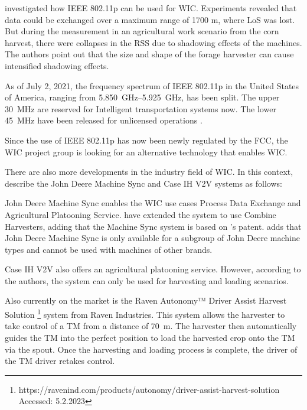\textcite{klingler_agriculture_2018} investigated how IEEE 802.11p can be used for \ac{WIC}. Experiments revealed
that data could be exchanged over a maximum range of 1700 m, where \ac{LoS} was lost. But during the
measurement in an agricultural work scenario from the corn harvest, there were collapses in the \ac{RSS}
due to shadowing effects of the machines. The authors point out that the size and shape of the forage harvester
can cause intensified shadowing effects.

As of July 2, 2021, the frequency spectrum of IEEE 802.11p in the United States of America, ranging from
\SIrange{5,850}{5,925}{\giga\hertz}, has been split. The upper \SI{30}{\mega\hertz} are reserved for
Intelligent transportation systems now. The lower \SI{45}{\mega\hertz} have been released for unlicensed
operations \cite{noauthor_use_2021}.

Since the use of IEEE 802.11p has now been newly
regulated by the FCC, the \ac{WIC} project group is looking for an alternative technology that enables \ac{WIC}.





There are also more developments in the industry field of \ac{WIC}. In this context, \textcite{thomasson_review_2018} describe the John Deere Machine Sync and Case IH V2V systems as follows:

John Deere Machine Sync enables the \ac{WIC} use cases Process Data Exchange and Agricultural Platooning Service. \textcite{liu_automation_2022} have extended the system to use Combine Harvesters, adding that the Machine Sync system is based on \textcite{metzler_system_2006}'s patent.
\textcite{smolnik_5g_2020} adds that John Deere Machine Sync is only available for a subgroup of John Deere machine types and cannot be used with machines of other brands.

Case IH V2V also offers an agricultural platooning service. However, according to the authors, the system can only be used for harvesting and loading scenarios.

Also currently on the market is the Raven Autonomy™ Driver Assist Harvest Solution \footnote{https://ravenind.com/products/autonomy/driver-assist-harvest-solution Accessed: 5.2.2023} system from Raven Industries. This system allows the harvester to take control of a \ac{TM} from a distance of \SI{70}{\metre}. The harvester then automatically guides the \ac{TM} into the perfect position to load the harvested crop onto the \ac{TM} via the spout. Once the harvesting and loading process is complete, the driver of the \ac{TM} driver retakes control.

